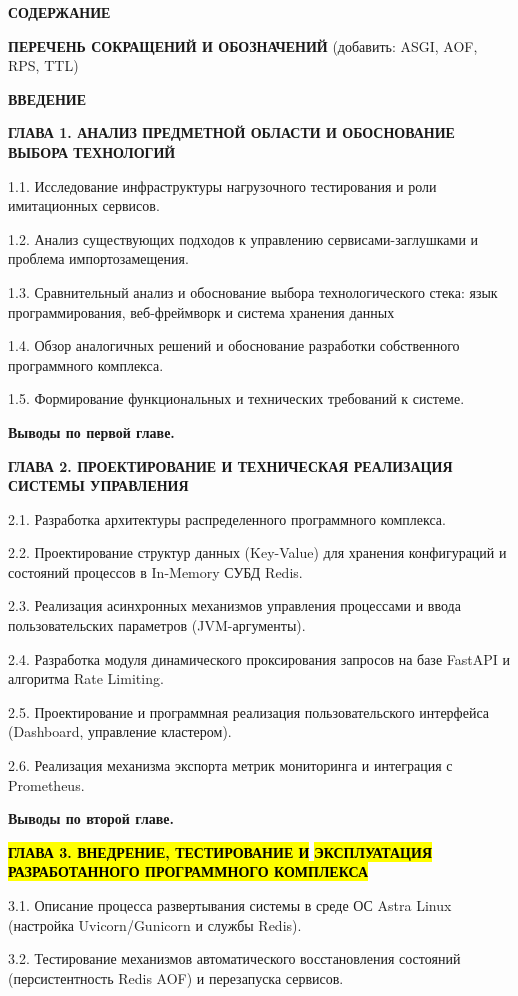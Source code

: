 \documentclass[
]{article}
\begin{document}
\textbf{СОДЕРЖАНИЕ}

\textbf{ПЕРЕЧЕНЬ СОКРАЩЕНИЙ И ОБОЗНАЧЕНИЙ} (добавить: ASGI, AOF, RPS,
TTL)

\textbf{ВВЕДЕНИЕ}

\textbf{ГЛАВА 1. АНАЛИЗ ПРЕДМЕТНОЙ ОБЛАСТИ И ОБОСНОВАНИЕ ВЫБОРА
ТЕХНОЛОГИЙ}

1.1. Исследование инфраструктуры нагрузочного тестирования и роли
имитационных сервисов.

1.2. Анализ существующих подходов к управлению сервисами-заглушками и
проблема импортозамещения.

1.3. Сравнительный анализ и обоснование выбора технологического стека:
язык программирования, веб-фреймворк и система хранения данных

1.4. Обзор аналогичных решений и обоснование разработки собственного
программного комплекса.

1.5. Формирование функциональных и технических требований к системе.

\textbf{Выводы по первой главе.}

\textbf{ГЛАВА 2. ПРОЕКТИРОВАНИЕ И ТЕХНИЧЕСКАЯ РЕАЛИЗАЦИЯ СИСТЕМЫ
УПРАВЛЕНИЯ}

2.1. Разработка архитектуры распределенного программного комплекса.

2.2. Проектирование структур данных (Key-Value) для хранения
конфигураций и состояний процессов в In-Memory СУБД Redis.

2.3. Реализация асинхронных механизмов управления процессами и ввода
пользовательских параметров (JVM-аргументы).

2.4. Разработка модуля динамического проксирования запросов на базе
FastAPI и алгоритма Rate Limiting.

2.5. Проектирование и программная реализация пользовательского
интерфейса (Dashboard, управление кластером).

2.6. Реализация механизма экспорта метрик мониторинга и интеграция с
Prometheus.

\textbf{Выводы по второй главе.}

\textbf{\hl{ГЛАВА 3. ВНЕДРЕНИЕ, ТЕСТИРОВАНИЕ И}}
\textbf{\hl{ЭКСПЛУАТАЦИЯ РАЗРАБОТАННОГО ПРОГРАММНОГО КОМПЛЕКСА}}

3.1. Описание процесса развертывания системы в среде ОС Astra Linux
(настройка Uvicorn/Gunicorn и службы Redis).

3.2. Тестирование механизмов автоматического восстановления состояний
(персистентность Redis AOF) и перезапуска сервисов.
\end{document}
